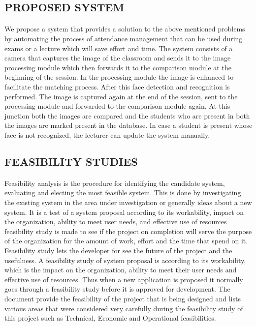 \documentclass[a4paper, 12pt]{report}
\begin{document}
\subsection{PROPOSED SYSTEM}
\paragraph{}
We propose a system that provides a solution to the above mentioned problems by automating the process of attendance management that can be used during exams or a lecture which will save effort and time. The system consists of a camera that captures the image of the classroom and sends it to the image processing module which then forwards it to the comparison module at the beginning of the session. In the processing module the image is enhanced to facilitate the matching process. After this face detection and recognition is performed. The image is captured again at the end of the session, sent to the processing module and forwarded to the comparison module again. At this junction both the images are compared and the students who are present in both the images are marked present in the database. In case a student is present whose face is not recognized, the lecturer can update the system manually.

\subsection{FEASIBILITY STUDIES}
\paragraph{}
Feasibility analysis is the procedure for identifying the candidate system, evaluating and electing the most feasible system. This is done by investigating the existing system in the area under investigation or generally ideas about a new system. It is a test of a system proposal according to its workability, impact on the organization, ability to meet user needs, and eﬀective use of resources feasibility study is made to see if the project on completion will serve the purpose of the organization for the amount of work, eﬀort and the time that spend on it. Feasibility study lets the developer for see the future of the project and the usefulness. A feasibility study of system proposal is according to its workability, which is the impact on the organization, ability to meet their user needs and eﬀective use of resources. Thus when a new application is proposed
it normally goes through a feasibility study before it is approved for development.
The document provide the feasibility of the project that is being designed and lists various areas that were considered very carefully during the feasibility study of this project such as Technical, Economic and Operational feasibilities.
\end{document}
